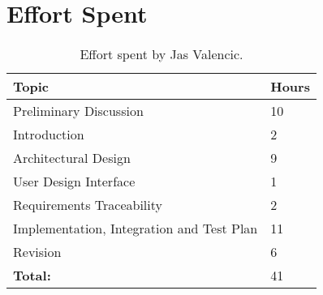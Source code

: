 \chapter{Effort Spent}

\begin{table}[H]
    \centering
    \begin{tabular}{| m{} | m{} |}
        \hline
        \textbf{Topic}                                                             & \textbf{Hours} \\
        \hline
        Preliminary Discussion                                                     & 10              \\
        \hline
        Introduction                                                               & 2              \\
        \hline
        Architectural Design                                                        & 9              \\
        \hline
        User Design Interface		                                                & 1              \\
        \hline
        Requirements Traceability		                                            & 2              \\
        \hline
        Implementation, Integration and Test Plan                                    & 11              \\
        \hline
        Revision                                                                   & 6              \\
        \hline
        \hline
        \textbf{Total:}                                                            & 41             \\
        \hline
    \end{tabular}
    \caption{Effort spent by Jas Valencic.}
\end{table}

